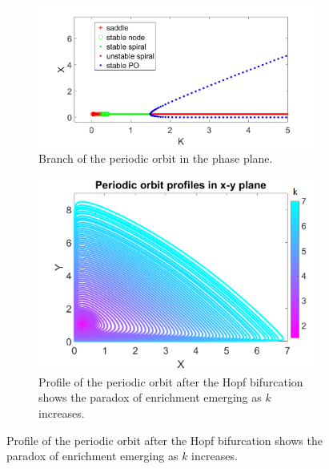 \documentclass[12pt]{article}
\begin{document}
\begin{figure}[H]
    \begin{subfigure}[b]{0.5\linewidth}
        \centering
        \includegraphics[width=\textwidth]{RM Model/periodicorbitbranch.png}
        \caption{Branch of the periodic orbit in the phase plane.}
        \hfill
    \end{subfigure}
    \begin{subfigure}[b]{0.5\linewidth}
        \centering
        \includegraphics[width=\textwidth]{RM Model/periodicorbitprofiles.png}
        \caption{Profile of the periodic orbit after the Hopf bifurcation shows the paradox of enrichment emerging as $k$ increases.}
    \end{subfigure}
\end{figure}\label{fig: paradox of enrichment}
\end{document}
